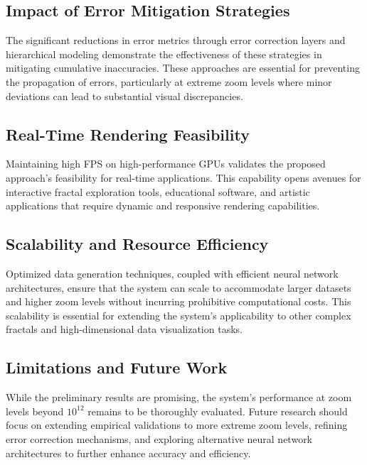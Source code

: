 \documentclass[journal]{IEEEaccess}
\begin{document}
\subsection{Impact of Error Mitigation Strategies}
The significant reductions in error metrics through error correction layers and hierarchical modeling demonstrate the effectiveness of these strategies in mitigating cumulative inaccuracies. These approaches are essential for preventing the propagation of errors, particularly at extreme zoom levels where minor deviations can lead to substantial visual discrepancies.

\subsection{Real-Time Rendering Feasibility}
Maintaining high FPS on high-performance GPUs validates the proposed approach's feasibility for real-time applications. This capability opens avenues for interactive fractal exploration tools, educational software, and artistic applications that require dynamic and responsive rendering capabilities.

\subsection{Scalability and Resource Efficiency}
Optimized data generation techniques, coupled with efficient neural network architectures, ensure that the system can scale to accommodate larger datasets and higher zoom levels without incurring prohibitive computational costs. This scalability is essential for extending the system's applicability to other complex fractals and high-dimensional data visualization tasks.

\subsection{Limitations and Future Work}
While the preliminary results are promising, the system's performance at zoom levels beyond \(10^{12}\) remains to be thoroughly evaluated. Future research should focus on extending empirical validations to more extreme zoom levels, refining error correction mechanisms, and exploring alternative neural network architectures to further enhance accuracy and efficiency.
\end{document}
